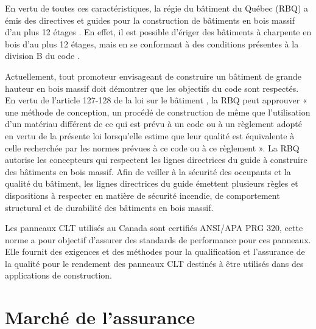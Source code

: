 \documentclass[11pt]{article}
\begin{document}
En vertu de toutes ces caractéristiques, la régie du bâtiment du Québec (RBQ) a émis des directives et guides pour la construction de bâtiments en bois massif d'au plus 12 étages \cite{RBQCLT}. En effet, il est possible d'ériger des bâtiments à charpente en bois d'au plus 12 étages, mais en se conformant à des conditions présentes à la division B du code \cite{CNB}.
 
Actuellement, tout promoteur envisageant de construire un bâtiment de grande hauteur en bois massif doit démontrer que les objectifs du code sont respectés. En vertu de l'article 127-128 de la loi sur le bâtiment \cite{article127}, la RBQ peut approuver « une méthode de conception, un procédé de construction de même que l'utilisation d'un matériau différent de ce qui est prévu à un code ou à un règlement adopté en vertu de la présente loi lorsqu'elle estime que leur qualité est équivalente à celle recherchée par les normes prévues à ce code ou à ce règlement ».  La RBQ autorise les concepteurs qui respectent les lignes directrices du guide à construire des bâtiments en bois massif. Afin de veiller à la sécurité des occupants et la qualité du bâtiment, les lignes directrices du guide émettent plusieurs règles et dispositions à respecter en matière de sécurité incendie, de comportement structural et de durabilité des bâtiments en bois massif.

Les panneaux CLT utilisés au Canada sont certifiés ANSI/APA PRG 320, cette norme \cite{PRG320} a pour objectif d'assurer des standards de performance pour ces panneaux. Elle fournit des exigences et des méthodes pour la qualification et l'assurance de la qualité pour le rendement des panneaux CLT destinés à être utilisés dans des applications de construction.

\section{Marché de l'assurance}
\end{document}
